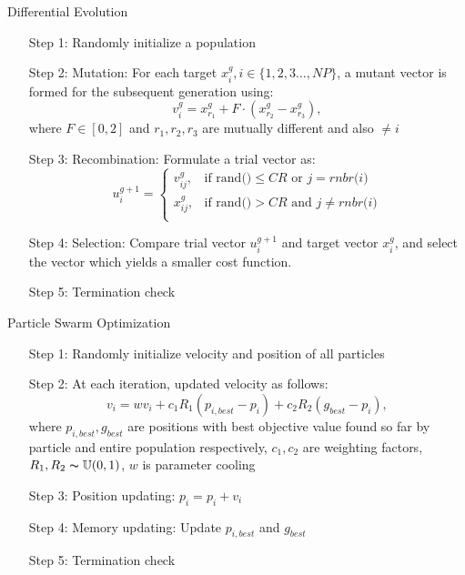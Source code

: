 \documentclass{beamer}
\begin{document}
\begin{frame}{Differential Evolution}
    \begin{enumerate}
        \item [Step 1:] Randomly initialize a population 
        \item [Step 2:] Mutation: For each target $x_i^g, i \in \{1, 2, 3 \ldots, NP\}$, a mutant vector is formed for the subsequent generation using:
            \[v_i^{g} = x_{r_1}^g + F \cdot (x_{r_2}^g - x_{r_3}^g), \]
            where $F \in [0,2]$ and $r_1, r_2, r_3$ are mutually different and also $ \neq i$
        \item [Step 3:] Recombination: Formulate a trial vector as:
    \[u_i^{g+1} = 
        \begin{cases}
            v_{ij}^g, & \text{if rand()} \leq CR \text{ or }j = \textit{rnbr(i)} \\
            x_{ij}^g, & \text{if rand()} > CR \text{ and }j \neq \textit{rnbr(i)} \\
    \end{cases}\]
        \item [Step 4:] Selection: Compare trial vector $u_i^{g+1}$ and target vector $x_i^g$, and select the vector which yields a smaller cost function.\\
        \item [Step 5:] Termination check
    \end{enumerate}

\end{frame}

\begin{frame}{Particle Swarm Optimization}
    \begin{enumerate}
        \item [Step 1:] Randomly initialize velocity and position of all particles
        \item [Step 2:] At each iteration, updated velocity as follows:
            \[ v_i = wv_i + c_1 R_1 (p_{i,best} - p_i) + c_2 R_2 (g_{best} - p_i) ,\]
            where $p_{i,best}, g_{best}$ are positions with best objective value found so far by particle and entire population respectively, $c_1,c_2$ are weighting factors, $R_1,R_2 \thicksim \mathbb U(0,1)$, $w$ is parameter cooling
        \item [Step 3:] Position updating: $p_i = p_i + v_i$
        \item [Step 4:] Memory updating: Update $p_{i,best}$ and $g_{best}$
        \item [Step 5:] Termination check
    \end{enumerate}
\end{frame}
\end{document}
